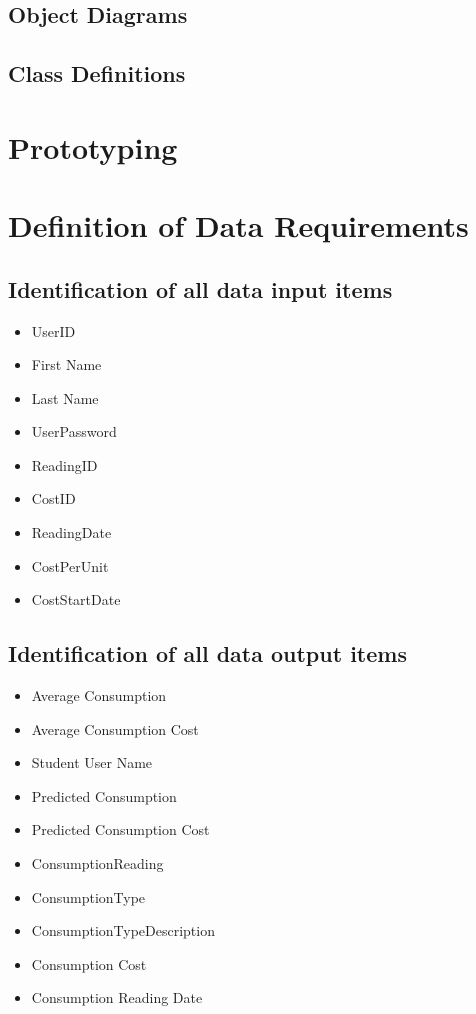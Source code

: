 \subsection{Object Diagrams}

\subsection{Class Definitions}

\section{Prototyping}

\section{Definition of Data Requirements}

\subsection{Identification of all data input items}
\begin{itemize}
\item{UserID}
\item{First Name}
\item{Last Name}
\item{UserPassword}
\item{ReadingID}
\item{CostID}
\item{ReadingDate}
\item{CostPerUnit}
\item{CostStartDate}
\end{itemize}

\subsection{Identification of all data output items}
\begin{itemize}
\item{Average Consumption}
\item{Average Consumption Cost}
\item{Student User Name}
\item{Predicted Consumption}
\item{Predicted Consumption Cost}
\item{ConsumptionReading}
\item{ConsumptionType}
\item{ConsumptionTypeDescription}
\item{Consumption Cost}
\item{Consumption Reading Date}
\end{itemize}

